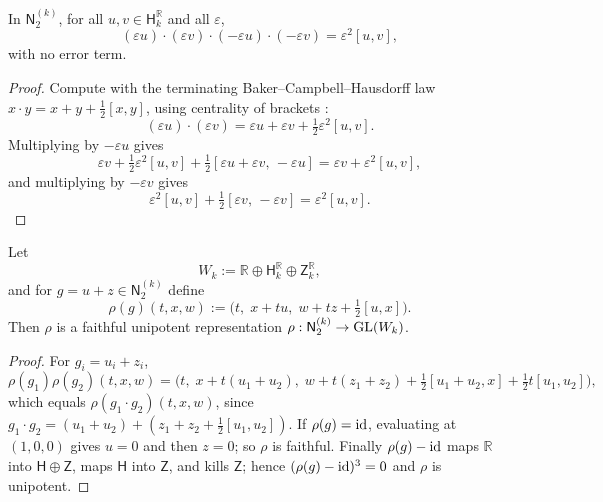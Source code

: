 \begin{lemma}
	\label{lem:two-step-holonomy}
	In \(\mathsf N_2^{(k)}\), for all \(u,v\in\mathsf H_k^{\mathbb R}\)
	and all \(\varepsilon\),
	\[
		(\varepsilon u)\cdot(\varepsilon v)\cdot(-\varepsilon u)\cdot(-\varepsilon v)
		=
		\varepsilon^2[u,v],
	\]
	with no error term.
\end{lemma}
\begin{proof}
	Compute with the terminating Baker--Campbell--Hausdorff law
	\(x\cdot y=x+y+\tfrac12[x,y]\), using centrality of brackets
	\cite{KobayashiNomizu1963}:
	\[
		(\varepsilon u)\cdot(\varepsilon v)
		=
		\varepsilon u+\varepsilon v+\tfrac12\varepsilon^2[u,v].
	\]
	Multiplying by \(-\varepsilon u\) gives
	\[
		\varepsilon v+\tfrac12\varepsilon^2[u,v]
		+\tfrac12[\varepsilon u+\varepsilon v,\,-\varepsilon u]
		=
		\varepsilon v+\varepsilon^2[u,v],
	\]
	and multiplying by \(-\varepsilon v\) gives
	\[
		\varepsilon^2[u,v]
		+\tfrac12[\varepsilon v,\,-\varepsilon v]
		=
		\varepsilon^2[u,v].
	\]
\end{proof}
\begin{lemma}
	\label{lem:unipotent-fiber}
	Let
	\[
		W_k:=\mathbb R\oplus\mathsf H_k^{\mathbb R}\oplus\mathsf Z_k^{\mathbb R},
	\]
	and for \(g=u+z\in\mathsf N_2^{(k)}\) define
	\[
		\rho(g)(t,x,w)
		:=
		\bigl(t,\;x+tu,\;w+tz+\tfrac12[u,x]\bigr).
	\]
	Then \(\rho\) is a faithful unipotent representation
	\(\rho:\mathsf N_2^{(k)}\to\mathrm{GL}(W_k)\).
\end{lemma}
\begin{proof}
	For \(g_i=u_i+z_i\),
	\[
		\rho(g_1)\rho(g_2)(t,x,w)
		=
		\bigl(t,\;x+t(u_1+u_2),\;
		w+t(z_1+z_2)+\tfrac12[u_1+u_2,x]+\tfrac12 t[u_1,u_2]\bigr),
	\]
	which equals \(\rho(g_1\cdot g_2)(t,x,w)\), since
	\(g_1\cdot g_2=(u_1+u_2)+(z_1+z_2+\tfrac12[u_1,u_2])\).
	If \(\rho(g)=\operatorname{id}\), evaluating at \((1,0,0)\) gives \(u=0\) and then
	\(z=0\); so \(\rho\) is faithful.  Finally \(\rho(g)-\operatorname{id}\) maps
	\(\mathbb R\) into \(\mathsf H\oplus\mathsf Z\), maps \(\mathsf H\)
	into \(\mathsf Z\), and kills \(\mathsf Z\); hence
	\((\rho(g)-\operatorname{id})^3=0\) and \(\rho\) is unipotent.
\end{proof}

